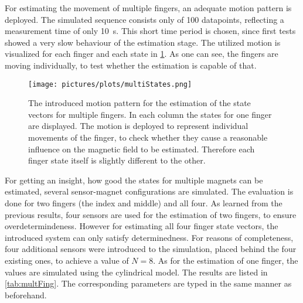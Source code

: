 For estimating the movement of multiple fingers, an adequate motion pattern is deployed. The simulated sequence consists only of 100 datapoints, reflecting a measurement time of only \SI{10}{\second}. This short time period is chosen, since first tests showed a very slow behaviour of the estimation stage. The utilized motion is visualized for each finger and each state in \ref{fig:multiFing}. As one can see, the fingers are moving individually, to test whether the estimation is capable of that.\\
\begin{figure}[!htb]
\centering
\texttt{[image: pictures/plots/multiStates.png]}
\caption[Introduced movement pattern for four finger estimation]
{The introduced motion pattern for the estimation of the state vectors for multiple fingers. In each column the states for one finger are displayed. The motion is deployed to represent individual movements of the finger, to check whether they cause a reasonable influence on the magnetic field to be estimated. Therefore each finger state itself is slightly different to the other.}
\label{fig:multiFing}
\end{figure}
For getting an insight, how good the states for multiple magnets can be estimated, several sensor-magnet configurations are simulated. The evaluation is done for two fingers (the index and middle) and all four. As learned from the previous results, four sensors are used for the estimation of two fingers, to ensure overdetermindeness. However for estimating all four finger state vectors, the introduced system can only satisfy determinedness. For reasons of completeness, four additional sensors were introduced to the simulation, placed behind the four existing ones, to achieve a value of $ N = 8 $. As for the estimation of one finger, the values are simulated using the cylindrical model. The results are listed in \ref{tab:multFing}. The corresponding parameters are typed in the same manner as beforehand.\\
